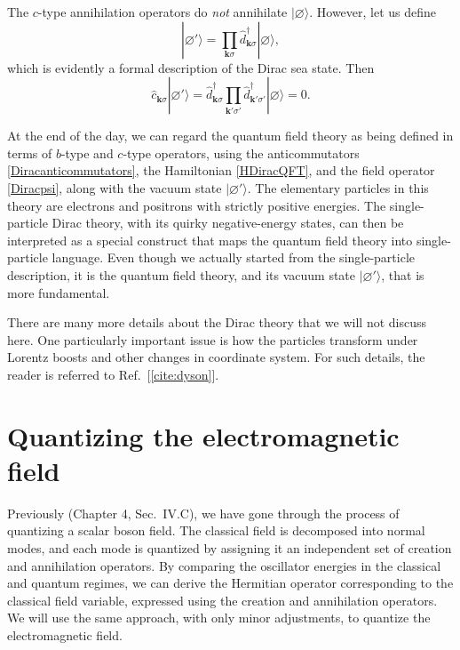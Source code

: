 \documentclass[prx,12pt]{revtex4-2}
\begin{document}
The $c$-type annihilation operators do \textit{not} annihilate
$|\varnothing\rangle$.  However, let us define
\begin{equation}
  |\varnothing'\rangle = \prod_{\mathbf{k}\sigma} \hat{d}_{\mathbf{k}\sigma}^\dagger
  |\varnothing\rangle,
\end{equation}
which is evidently a formal description of the Dirac sea state.  Then
\begin{equation}
  \hat{c}_{\mathbf{k}\sigma} |\varnothing'\rangle = 
  \hat{d}^\dagger_{\mathbf{k}\sigma} \prod_{\mathbf{k}'\sigma'}
  \hat{d}_{\mathbf{k}'\sigma'}^\dagger |\varnothing\rangle = 0.
\end{equation}

At the end of the day, we can regard the quantum field theory as being
defined in terms of $b$-type and $c$-type operators, using the
anticommutators \eqref{Diracanticommutators}, the Hamiltonian
\eqref{HDiracQFT}, and the field operator \eqref{Diracpsi}, along with
the vacuum state $|\varnothing'\rangle$.  The elementary particles in
this theory are electrons and positrons with strictly positive
energies.  The single-particle Dirac theory, with its quirky
negative-energy states, can then be interpreted as a special construct
that maps the quantum field theory into single-particle language.
Even though we actually started from the single-particle description,
it is the quantum field theory, and its vacuum state
$|\varnothing'\rangle$, that is more fundamental.

There are many more details about the Dirac theory that we will not
discuss here.  One particularly important issue is how the particles
transform under Lorentz boosts and other changes in coordinate system.
For such details, the reader is referred to Ref.~[\ref{cite:dyson}].

\section{Quantizing the electromagnetic field}
\label{sec:em_quantization}

Previously (Chapter 4, Sec.~IV.C), we have gone through the process of
quantizing a scalar boson field.  The classical field is decomposed
into normal modes, and each mode is quantized by assigning it an
independent set of creation and annihilation operators.  By comparing
the oscillator energies in the classical and quantum regimes, we can
derive the Hermitian operator corresponding to the classical field
variable, expressed using the creation and annihilation operators.  We
will use the same approach, with only minor adjustments, to quantize
the electromagnetic field.
\end{document}

